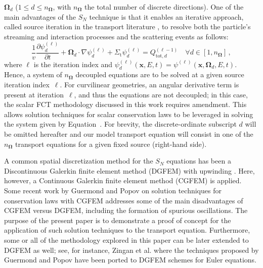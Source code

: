 \documentclass[xchauthor,chkrefs,fixeqskip,GCNS,amsmath,amsthm]{yjcphg}
\theoremstyle{remark}
\newcommand{\di}{\bm{\Omega}}
\begin{document}
$\di_{d}$ ($1 \le d \le n_{\di}$, with $n_{\di}$ the total number of
discrete directions). One of the main advantages of the $S_{N}$
technique is that it enables an iterative approach, called source
iteration in the transport literature
\cite{glasstone,lewis,duderstadt}, to resolve both the particle's
streaming and interaction processes and the scattering events as
follows:
%
\begin{equation}
\label{eq:SI}
\frac{1}{v}\frac{\partial\psi_{d}^{(\ell)}}{\partial t}
+ \di_{d}
\cdot\nabla\psi_{d}^{(\ell)}
+ \Sigma_{\text{t}}\psi_{d}^{(
\ell)} = Q_{\text{tot},d}^{(\ell-1)} \quad\forall d \in[1,n_{\di}]
\,,
\end{equation}
%
where $\ell$ is the iteration index and $\psi_{d}^{(\ell)}(
\mathbf{x},E,t) = \psi^{(\ell)}(\mathbf{x},\di_{d},E,t)$. Hence, a
system of $n_{\di}$ decoupled equations are to be solved at a given
source iteration index~$\ell$. For curvilinear geometries, an angular
derivative term is present at iteration~$\ell$, and thus the equations
are not decoupled; in this case, the scalar FCT methodology discussed
in this work requires amendment. This allows solution techniques for
scalar conservation laws to be leveraged in solving the system given by
Equation~. For brevity, the discrete-ordinate subscript
$d$ will be omitted hereafter and our model transport equation will
consist in one of the $n_{\di}$ transport equations for a given fixed
source (right-hand side).

A common spatial discretization method for the $S_{N}$ equations has
been a Discontinuous Galerkin finite element method (DGFEM) with
upwinding \cite{Lesaint1974,Reed_Hill_1973}. Here, however, a
Continuous Galerkin finite element method (CGFEM) is applied. Some
recent work by Guermond and Popov \cite{guermond_ev} on solution
techniques for conservation laws with CGFEM addresses some of the main
disadvantages of CGFEM versus DGFEM, including the formation of spurious
oscillations. The purpose of the present paper is to demonstrate a proof
of concept for the application of such solution techniques to the
transport equation. Furthermore, some or all of the methodology explored
in this paper can be later extended to DGFEM as well; see, for instance,
Zingan et al. \cite{zingan_2013} where the techniques proposed by
Guermond and Popov \cite{guermond_ev} have been ported to DGFEM
schemes for Euler equations.
\end{document}
